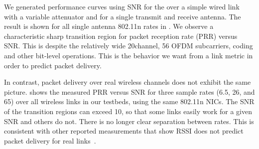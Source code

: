 We generated performance curves using SNR for the  over a simple wired link with a variable attenuator and for a single transmit and receive antenna. The result is shown for all single antenna 802.11n rates in . 
We observe a characteristic sharp transition region for packet reception rate (PRR) versus SNR\@. This is despite the relatively wide 20\MHz channel, 56 OFDM subcarriers, coding and other bit-level operations. This is the behavior we want from a link metric in order to predict packet delivery.

In contrast, packet delivery over real wireless channels does not exhibit the same picture.  shows the measured PRR versus SNR for three sample rates (6.5, 26, and 65\Mbps) over all wireless links in our testbeds, using the same 802.11n NICs. The SNR of the transition regions can exceed 10\dB, so that some links easily work for a given SNR and others do not. There is no longer clear separation between rates. This is consistent with other reported measurements that show RSSI does not predict packet delivery for real links~\cite{aguayo_roofnet, reis_sigcomm06, snr_infocom08, zhao_sensys03}.

\ifx\mainfile\undefined

\fi
